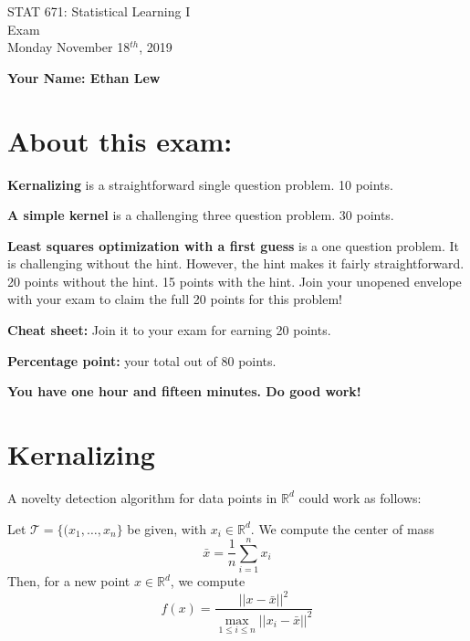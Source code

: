 \documentclass[12pt]{article}
\begin{document}
\thispagestyle{empty}
\vspace{10pt}
\begin{center}
  {\Large STAT 671: Statistical Learning I}\\
{\Large Exam }\\
{\Large Monday November 18$^{th}$, 2019}
\end{center}
\noindent
{\Large \bf Your Name: Ethan Lew}

\section*{About this exam:}



\noindent 
{\bf Kernalizing} is a straightforward single question problem. 10 points.  


\noindent
{\bf A simple kernel} is a challenging three question problem.  30 points. 

\noindent
{\bf  Least squares optimization with a first guess} is a one question problem.  It is challenging without the hint. However, the hint makes it fairly straightforward.  20 points without the hint. 15 points with the hint. Join your unopened envelope with your exam to claim the full 20 points for this problem! 

\noindent
{\bf Cheat sheet:} Join it to your exam for earning 20 points. 

\noindent
{\bf Percentage point:} your total out of 80 points. 

\noindent
{\bf You have one hour and fifteen minutes. Do good work!}
\section{Kernalizing}
A novelty detection algorithm for data points in $\mathbb{R}^d$ could work as follows: 

Let $\mathcal{T}=\{(x_1,\ldots,x_n\}$ be given, with $x_i \in \mathbb{R}^d$. 
We compute the center of mass 
\begin{equation}
\bar{x}=\frac{1}{n}\sum_{i=1}^n x_i
\end{equation}
Then, for a new point $x \in \mathbb{R}^d$, we compute 
\begin{equation}
f(x) = \frac{||x-\bar{x}||^2}{\max_{1\leq i \leq n}||x_i-\bar{x}||^2}
\end{equation}
\end{document}
